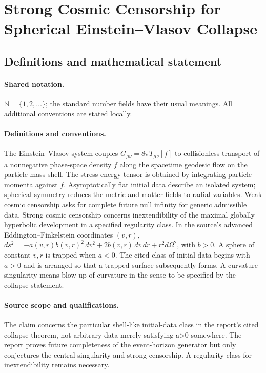 \documentclass[11pt]{article}
\begin{document}
\section{Strong Cosmic Censorship for Spherical Einstein–Vlasov Collapse}\label{statement}

\subsection{Definitions and mathematical statement}

\paragraph{Shared notation.}$\mathbb N=\{1,2,\ldots\}$; the standard number fields have their usual meanings. All additional conventions are stated locally.


\paragraph{Definitions and conventions.} The Einstein--Vlasov system couples $G_{\mu\nu}=8\pi T_{\mu\nu}[f]$ to collisionless transport of a nonnegative phase-space density $f$ along the spacetime geodesic flow on the particle mass shell. The stress-energy tensor is obtained by integrating particle momenta against $f$. Asymptotically flat initial data describe an isolated system; spherical symmetry reduces the metric and matter fields to radial variables. Weak cosmic censorship asks for complete future null infinity for generic admissible data. Strong cosmic censorship concerns inextendibility of the maximal globally hyperbolic development in a specified regularity class. In the source's advanced Eddington--Finkelstein coordinates $(v,r)$, $ds^2=-a(v,r)b(v,r)^2\,dv^2+2b(v,r)\,dv\,dr+r^2d\Omega^2$, with $b>0$. A sphere of constant $v,r$ is trapped when $a<0$. The cited class of initial data begins with $a>0$ and is arranged so that a trapped surface subsequently forms. A curvature singularity means blow-up of curvature in the sense to be specified by the collapse statement.

\paragraph{Source scope and qualifications.} The claim concerns the particular shell-like initial-data class in the report's cited collapse theorem, not arbitrary data merely satisfying a>0 somewhere. The report proves future completeness of the event-horizon generator but only conjectures the central singularity and strong censorship. A regularity class for inextendibility remains necessary.
\end{document}
